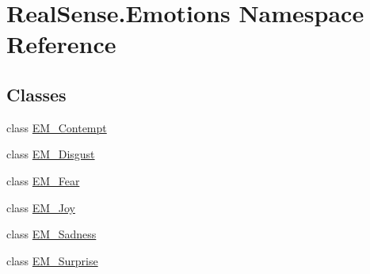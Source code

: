 \hypertarget{namespace_real_sense_1_1_emotions}{}\section{Real\+Sense.\+Emotions Namespace Reference}
\label{namespace_real_sense_1_1_emotions}
\subsection*{Classes}
\begin{DoxyCompactItemize}
\item 
class \hyperlink{class_real_sense_1_1_emotions_1_1_e_m___contempt}{E\+M\+\_\+\+Contempt}
\item 
class \hyperlink{class_real_sense_1_1_emotions_1_1_e_m___disgust}{E\+M\+\_\+\+Disgust}
\item 
class \hyperlink{class_real_sense_1_1_emotions_1_1_e_m___fear}{E\+M\+\_\+\+Fear}
\item 
class \hyperlink{class_real_sense_1_1_emotions_1_1_e_m___joy}{E\+M\+\_\+\+Joy}
\item 
class \hyperlink{class_real_sense_1_1_emotions_1_1_e_m___sadness}{E\+M\+\_\+\+Sadness}
\item 
class \hyperlink{class_real_sense_1_1_emotions_1_1_e_m___surprise}{E\+M\+\_\+\+Surprise}
\end{DoxyCompactItemize}
